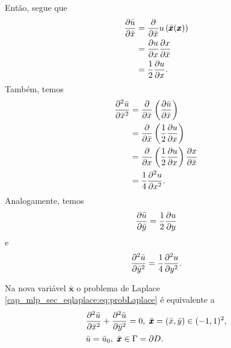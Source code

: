 Então, segue que
\begin{equation}
  \begin{aligned}
    \frac{\partial\bar{u}}{\partial\bar{x}} &= \frac{\partial}{\partial\bar{x}}u\left(\bar{\pmb{x}}(\pmb{x})\right)\\
    &= \frac{\partial u}{\partial x}\frac{\partial x}{\partial \bar{x}}\\
    &= \frac{1}{2}\frac{\partial u}{\partial x}.
  \end{aligned}
\end{equation}
Também, temos
\begin{equation}
  \begin{aligned}
    \frac{\partial^2\bar{u}}{\partial \bar{x}^2} &= \frac{\partial}{\partial\bar{x}}\left(\frac{\partial\bar{u}}{\partial\bar{x}}\right)\\
    &= \frac{\partial}{\partial\bar{x}}\left(\frac{1}{2}\frac{\partial u}{\partial x}\right)\\
    &= \frac{\partial}{\partial x}\left(\frac{1}{2}\frac{\partial u}{\partial x}\right)\frac{\partial x}{\partial \bar{x}}\\
    &= \frac{1}{4}\frac{\partial^2 u}{\partial x^2}.
  \end{aligned}
\end{equation}
Analogamente, temos
\begin{equation}
  \frac{\partial\bar{u}}{\partial\bar{y}} = \frac{1}{2}\frac{\partial u}{\partial y}
\end{equation}
e
\begin{equation}
  \frac{\partial^2\bar{u}}{\partial\bar{y}^2} = \frac{1}{4}\frac{\partial^2 u}{\partial y^2}.
\end{equation}

Na nova variável $\bar{\pmb{x}}$ o problema de Laplace \eqref{cap_mlp_sec_eqlaplace:eq:probLaplace} é equivalente a
\begin{subequations}
  \begin{align}
    &\frac{\partial^2\bar{u}}{\partial\bar{x}^2} + \frac{\partial^2\bar{u}}{\partial\bar{y}^2} = 0, ~\bar{\pmb{x}}=(\bar{x}, \bar{y})\in (-1, 1)^2,\\
    &\bar{u} = \bar{u}_0, ~\bar{\pmb{x}}\in\Gamma=\partial D.
  \end{align}
\end{subequations}

